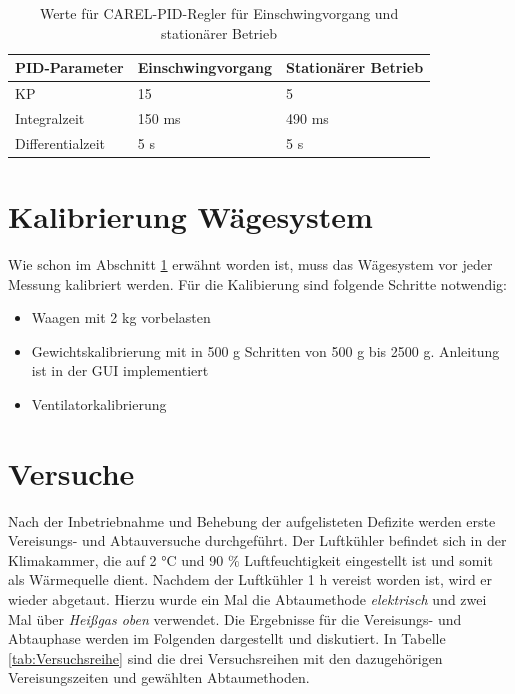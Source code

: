 \begin{table}[htb]
\centering
\caption{Werte für CAREL-PID-Regler für Einschwingvorgang und stationärer Betrieb}\vspace{6pt}
\begin{tabular}{lll}
\hline 
\textbf{PID-Parameter} & \textbf{Einschwingvorgang} & \textbf{Stationärer Betrieb} \\ 
\hline 
\hline
KP & 15 & 5 \\ 
\hline 
Integralzeit & 150 ms & 490 ms \\ 
\hline 
Differentialzeit & 5 s & 5 s \\ 
\hline 
\hline
\end{tabular} 
\label{tab:Regler_Uebersicht}
\end{table}

\section{Kalibrierung Wägesystem}
\label{sec:Waegesystem}

Wie schon im Abschnitt \ref{sec:Waegesystem} erwähnt worden ist, muss das Wägesystem vor jeder Messung kalibriert werden. Für die Kalibierung sind folgende Schritte notwendig:

\begin{itemize}
\item Waagen mit 2 kg vorbelasten
\item Gewichtskalibrierung mit in 500 g Schritten von 500 g bis 2500 g. Anleitung ist in der GUI implementiert
\item Ventilatorkalibrierung
\end{itemize}



\section{Versuche}
\label{sec:Versuche}

Nach der Inbetriebnahme und Behebung der aufgelisteten Defizite werden erste Vereisungs- und Abtauversuche durchgeführt. Der Luftkühler befindet sich in der Klimakammer, die auf 2 °C und 90 $\%$ Luftfeuchtigkeit eingestellt ist und somit als Wärmequelle dient. Nachdem der Luftkühler 1 h vereist worden ist, wird er wieder abgetaut. Hierzu wurde ein Mal die Abtaumethode \textit{elektrisch} und zwei Mal über \textit{Heißgas oben} verwendet. Die Ergebnisse für die Vereisungs- und Abtauphase werden im Folgenden dargestellt und diskutiert. In Tabelle \ref{tab:Versuchsreihe} sind die drei Versuchsreihen mit den dazugehörigen Vereisungszeiten und gewählten Abtaumethoden. 


